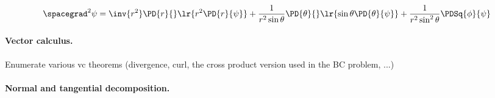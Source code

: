 \begin{dmath}\label{eqn:usefulFormulas:940}
\spacegrad^2 \psi
=
    \inv{r^2} \PD{r}{} \lr{ r^2 \PD{r}{ \psi} }
   + \frac{1}{r^2 \sin\theta} \PD{\theta}{} \lr{ \sin\theta \PD{\theta}{ \psi } }
   + \frac{1}{r^2 \sin^2\theta} \PDSq{\phi}{ \psi}
\end{dmath}

\paragraph{Vector calculus.}

Enumerate various vc theorems (divergence, curl, the cross product version used in the BC problem, ...)

\paragraph{Normal and tangential decomposition.}


